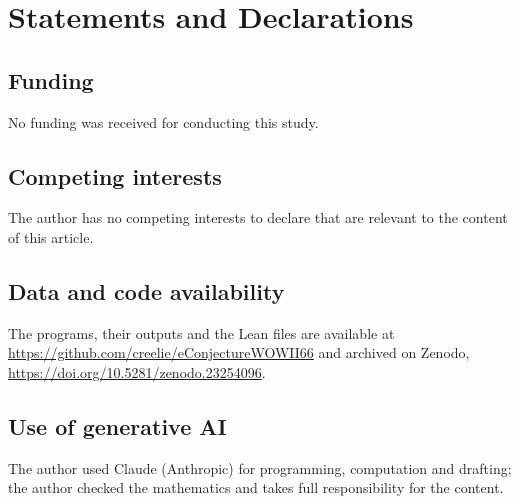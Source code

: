 \documentclass[11pt]{amsart}
\theoremstyle{definition}
\theoremstyle{remark}
\numberwithin{equation}{section}
\providecommand{\doi}[1]{\url{https://doi.org/#1}}
\begin{document}
\section*{Statements and Declarations}

\subsection*{Funding} No funding was received for conducting this study.

\subsection*{Competing interests} The author has no competing interests to declare that are relevant to the content of this article.

\subsection*{Data and code availability} The programs, their outputs and the Lean files are available at \url{https://github.com/creelie/eConjectureWOWII66} and archived on Zenodo, \doi{10.5281/zenodo.23254096}.

\subsection*{Use of generative AI} The author used Claude (Anthropic) for programming, computation and drafting; the author checked the mathematics and takes full responsibility for the content.
\end{document}
